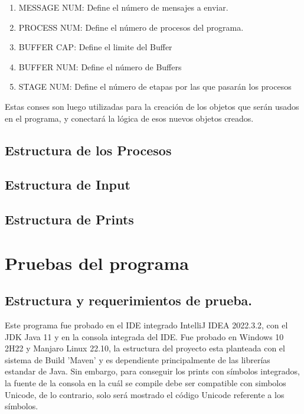 \documentclass[a4paper]{article}
\begin{document}
    \begin{enumerate}
        \item MESSAGE NUM: Define el número de mensajes a enviar.
        \item PROCESS NUM: Define el número de procesos del programa.
        \item BUFFER CAP: Define el limite del Buffer
        \item BUFFER NUM: Define el número de Buffers
        \item STAGE NUM: Define el número de etapas por las que pasarán los procesos
    \end{enumerate}

    Estas conses son luego utilizadas para la creación de los objetos
    que serán usados en el programa, y conectará la lógica de esos
    nuevos objetos creados. 

    \subsection{Estructura de los Procesos}
    
    \subsection{Estructura de Input}
    
    \subsection{Estructura de Prints}
    

\section{Pruebas del programa}

\subsection{Estructura y requerimientos de prueba.}
Este programa fue probado en el IDE integrado IntelliJ IDEA 2022.3.2, con
el JDK Java 11 y en la consola integrada del IDE. Fue probado en Windows 10 
2H22 y Manjaro Linux 22.10, la estructura del proyecto esta planteada con el
sistema de Build 'Maven' y es dependiente principalmente de las librerías estandar
de Java. Sin embargo, para conseguir los prints con símbolos integrados, la fuente
de la consola en la cuál se compile debe ser compatible con simbolos Unicode,
de lo contrario, solo será mostrado el código Unicode referente a los símbolos.
\end{document}
